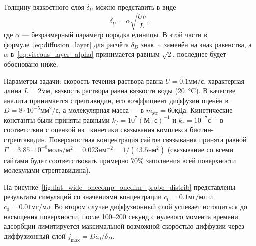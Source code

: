 \documentclass[oneside,final,12pt]{extreport}
\begin{document}
Толщину вязкостного слоя $\delta_U$ можно представить в виде
\begin{equation}
  \label{eq:viscous_layer_alpha}
  \delta_U = \alpha\sqrt{\frac{U\nu}{L}},
\end{equation}
где $\alpha$ --- безразмерный параметр порядка единицы.
В этой части в формуле~\eqref{eq:diffusion_layer} для расчёта $\delta_D$
знак $\sim$ заменён на знак равенства, а
$\alpha$ в~\eqref{eq:viscous_layer_alpha} принимается равным $\sqrt{2}$,
последнее будет обосновано ниже.

Параметры задачи:%
скорость течения раствора равна $U = 0.1\text{мм}/\text{с}$,
характерная длина $L = 2\text{мм}$,
вязкость раствора равна вязкости воды (\SI{20}{\celsius}).
В качестве аналита принимается стрептавидин,
его коэффициент диффузии оценён в $D = 8\cdot10^{-5}\text{мм}^2/\text{с}$,
а молекулярная масса --- в $m_{\text{str}} = 60\text{кДа}$.
Кинетические константы были приняты равными
$k_f = 10^7\left(\text{М}\cdot\text{с}\right)^{-1}$
и $k_r = 10^{-7}\text{с}^{-1}$ в соответствии с оценкой из~%
\cite{bib:biotin_streptavidin_kinetics}
кинетики связывания комплекса биотин-стрептавидин.
Поверхностная концентрация сайтов связывания принята равной
$\Gamma = 3.85\cdot10^{-8}\text{моль}/\text{м}^2 = 0.023\text{нм}^{-2} = 1/\left(43.5\text{нм}^2\right)$
(связывание со всеми сайтами будет соответствовать примерно
70\% заполнения всей поверхности молекулами стрептавидина).

На рисунке~\ref{fig:flat_wide_onecomp_onedim_probe_distrib}
представлены результаты симуляций со значениями концентрации
$c_0 = 0.1 \text{мг}/\text{мл}$ и $c_0 = 0.01 \text{мг}/\text{мл}$.
Во втором случае диффузионный слой успевает истощиться до насыщения поверхности,
после 100--200 секунд с нулевого момента времени адсорбции лимитируется
максимальной возможной скоростью диффузии через диффузионный слой
$j_{\text{max}} = D c_0 / \delta_D$.
\end{document}
